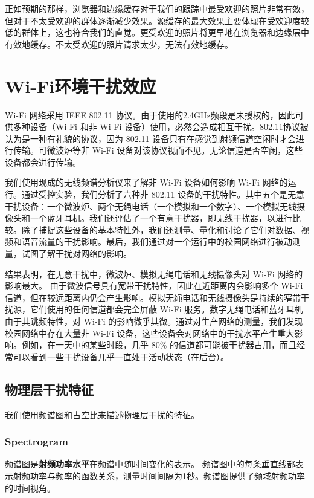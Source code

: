 正如预期的那样，浏览器和边缘缓存对于我们的跟踪中最受欢迎的照片非常有效，但对于不太受欢迎的群体逐渐减少效果。源缓存的最大效果主要体现在受欢迎度较低的群体上，这也符合我们的直觉。更受欢迎的照片将更早地在浏览器和边缘层中有效地缓存。不太受欢迎的照片请求太少，无法有效地缓存。


\chapter{Wi-Fi环境干扰效应}
Wi-Fi 网络采用 IEEE 802.11 协议。由于使用的2.4GHz频段是未授权的，因此可供多种设备（Wi-Fi 和非 Wi-Fi 设备）使用，必然会造成相互干扰。802.11协议被认为是一种有礼貌的协议，因为 802.11 设备只有在感觉到射频信道空闲时才会进行传输。可微波炉等非 Wi-Fi 设备对该协议视而不见。无论信道是否空闲，这些设备都会进行传输。

我们使用现成的无线频谱分析仪来了解非 Wi-Fi 设备如何影响 Wi-Fi 网络的运行。通过受控实验，我们分析了六种非 802.11 设备的干扰特性。其中五个是无意干扰设备：一个微波炉、两个无绳电话（一个模拟和一个数字）、一个模拟无线摄像头和一个蓝牙耳机。我们还评估了一个有意干扰器，即无线干扰器，以进行比较。除了捕捉这些设备的基本特性外，我们还测量、量化和讨论了它们对数据、视频和语音流量的干扰影响。最后，我们通过对一个运行中的校园网络进行被动测量，试图了解干扰对网络的影响。

结果表明，在无意干扰中，微波炉、模拟无绳电话和无线摄像头对 Wi-Fi 网络的影响最大。
由于微波信号具有宽带干扰特性，因此在近距离内会影响多个 Wi-Fi 信道，但在较远距离内仍会产生影响。模拟无绳电话和无线摄像头是持续的窄带干扰源，它们使用的任何信道都会完全屏蔽 Wi-Fi 服务。数字无绳电话和蓝牙耳机由于其跳频特性，对 Wi-Fi 的影响微乎其微。通过对生产网络的测量，我们发现校园网络中存在大量非 Wi-Fi 设备，这些设备会对网络中的干扰水平产生重大影响。例如，在一天中的某些时段，几乎 80\% 的信道都可能被干扰器占用，而且经常可以看到一些干扰设备几乎一直处于活动状态（在后台）。

\section{物理层干扰特征}

我们使用频谱图和占空比来描述物理层干扰的特征。

\subsection{Spectrogram}

频谱图是\textbf{射频功率水平}在频谱中随时间变化的表示。
频谱图中的每条垂直线都表示射频功率与频率的函数关系，测量时间间隔为1秒。频谱图提供了频域射频功率的时间视角。

